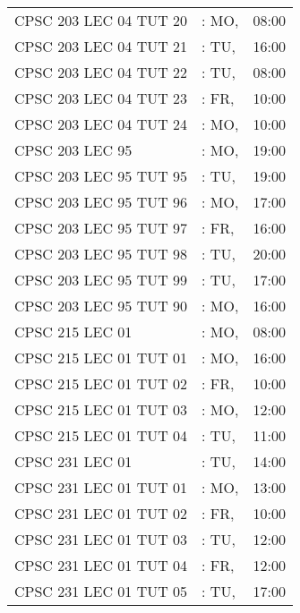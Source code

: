 \documentclass[11pt]{article}
\begin{document}
\begin{longtable}{l l r}
CPSC 203 LEC 04 TUT 20       	&\hspace*{1.5cm}:  MO,& 08:00\tabularnewline
CPSC 203 LEC 04 TUT 21       	&\hspace*{1.5cm}:  TU,& 16:00\tabularnewline
CPSC 203 LEC 04 TUT 22       	&\hspace*{1.5cm}:  TU,& 08:00\tabularnewline
CPSC 203 LEC 04 TUT 23       	&\hspace*{1.5cm}:  FR,& 10:00\tabularnewline
CPSC 203 LEC 04 TUT 24       	&\hspace*{1.5cm}:  MO,& 10:00\tabularnewline
CPSC 203 LEC 95               	&\hspace*{1.5cm}:  MO,& 19:00\tabularnewline
CPSC 203 LEC 95 TUT 95        &\hspace*{1.5cm}:  TU,& 19:00\tabularnewline
CPSC 203 LEC 95 TUT 96        &\hspace*{1.5cm}:  MO,& 17:00\tabularnewline
CPSC 203 LEC 95 TUT 97        &\hspace*{1.5cm}:  FR,& 16:00\tabularnewline
CPSC 203 LEC 95 TUT 98        &\hspace*{1.5cm}:  TU,& 20:00\tabularnewline
CPSC 203 LEC 95 TUT 99        &\hspace*{1.5cm}:  TU,& 17:00\tabularnewline
CPSC 203 LEC 95 TUT 90        &\hspace*{1.5cm}:  MO,& 16:00\tabularnewline
CPSC 215 LEC 01               	&\hspace*{1.5cm}:  MO,& 08:00\tabularnewline
CPSC 215 LEC 01 TUT 01        &\hspace*{1.5cm}:  MO,& 16:00\tabularnewline
CPSC 215 LEC 01 TUT 02        &\hspace*{1.5cm}:  FR,& 10:00\tabularnewline
CPSC 215 LEC 01 TUT 03        &\hspace*{1.5cm}:  MO,& 12:00\tabularnewline
CPSC 215 LEC 01 TUT 04        &\hspace*{1.5cm}:  TU,& 11:00\tabularnewline
CPSC 231 LEC 01               	&\hspace*{1.5cm}:  TU,& 14:00\tabularnewline
CPSC 231 LEC 01 TUT 01        &\hspace*{1.5cm}:  MO,& 13:00\tabularnewline
CPSC 231 LEC 01 TUT 02        &\hspace*{1.5cm}:  FR,& 10:00\tabularnewline
CPSC 231 LEC 01 TUT 03        &\hspace*{1.5cm}:  TU,& 12:00\tabularnewline
CPSC 231 LEC 01 TUT 04        &\hspace*{1.5cm}:  FR,& 12:00\tabularnewline
CPSC 231 LEC 01 TUT 05        &\hspace*{1.5cm}:  TU,& 17:00\tabularnewline

\end{longtable}
\end{document}
